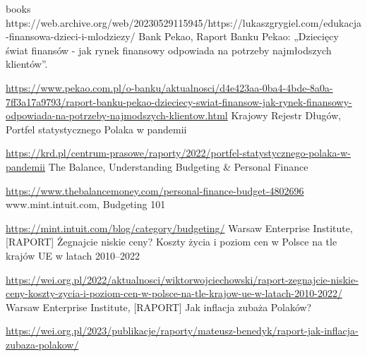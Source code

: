\documentclass[a4paper,10pt, twoside]{report}
\begin{document}
\begin{thebibliography} {books}
{        https://web.archive.org/web/20230529115945/https://lukaszgrygiel.com/edukacja-finansowa-dzieci-i-mlodziezy/}
     Bank Pekao, Raport Banku Pekao: „Dziecięcy świat finansów - jak rynek finansowy odpowiada na potrzeby najmłodszych klientów”. \raggedright\url{
        https://www.pekao.com.pl/o-banku/aktualnosci/d4e423aa-0ba4-4bde-8a0a-7ff3a17a9793/raport-banku-pekao-dzieciecy-swiat-finansow-jak-rynek-finansowy-odpowiada-na-potrzeby-najmodszych-klientow.html}
     Krajowy Rejestr Długów, Portfel statystycznego Polaka w pandemii \raggedright\url{
        https://krd.pl/centrum-prasowe/raporty/2022/portfel-statystycznego-polaka-w-pandemii}
     The Balance, Understanding Budgeting \& Personal Finance\raggedright\url{
        https://www.thebalancemoney.com/personal-finance-budget-4802696}
     www.mint.intuit.com, Budgeting 101 \raggedright\url{
        https://mint.intuit.com/blog/category/budgeting/}
     Warsaw Enterprise Institute, [RAPORT] Żegnajcie niskie ceny? Koszty życia i poziom cen w Polsce na tle krajów UE w latach 2010–2022 \raggedright\url{
        https://wei.org.pl/2022/aktualnosci/wiktorwojciechowski/raport-zegnajcie-niskie-ceny-koszty-zycia-i-poziom-cen-w-polsce-na-tle-krajow-ue-w-latach-2010-2022/}
     Warsaw Enterprise Institute, [RAPORT] Jak inflacja zubaża Polaków? \raggedright\url{
        https://wei.org.pl/2023/publikacje/raporty/mateusz-benedyk/raport-jak-inflacja-zubaza-polakow/}
\end{thebibliography}

\listoffigures
\listoftables
\lstlistoflistings
\end{document}

